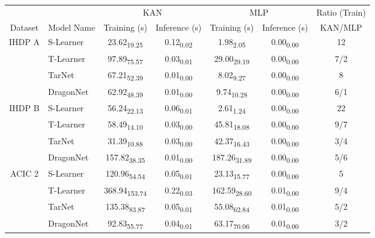 \begin{table}[ht]
\centering
\small
\begin{tabular}{c l cc cc c}

& & \multicolumn{2}{c}{KAN} & \multicolumn{2}{c}{MLP} & Ratio (Train) \\
Dataset & Model Name & Training (s) & Inference (s) & Training (s) & Inference (s) & KAN/MLP \\
 \hline
\multirow{4}{*}{IHDP A}
& S-Learner  & 23.62\textsubscript{19.25} & 0.12\textsubscript{0.02} & 1.98\textsubscript{2.05} & 0.00\textsubscript{0.00} & 12 \\
& T-Learner  & 97.89\textsubscript{75.57} & 0.03\textsubscript{0.01} & 29.00\textsubscript{29.19} & 0.00\textsubscript{0.00} & 7/2 \\
& TarNet     & 67.21\textsubscript{52.39} & 0.01\textsubscript{0.00} & 8.02\textsubscript{9.27} & 0.00\textsubscript{0.00} & 8 \\
& DragonNet  & 62.92\textsubscript{48.39} & 0.01\textsubscript{0.00} & 9.74\textsubscript{10.28} & 0.00\textsubscript{0.00} & 6/1 \\
\hline
\multirow{4}{*}{IHDP B}
& S-Learner  & 56.24\textsubscript{22.13} & 0.06\textsubscript{0.01} & 2.61\textsubscript{1.24} & 0.00\textsubscript{0.00} & 22 \\
& T-Learner  & 58.49\textsubscript{14.10} & 0.03\textsubscript{0.00} & 45.81\textsubscript{18.08} & 0.00\textsubscript{0.00} & 9/7 \\
& TarNet     & 31.39\textsubscript{10.88} & 0.03\textsubscript{0.00} & 42.37\textsubscript{16.43} & 0.00\textsubscript{0.00} & 3/4 \\
& DragonNet  & 157.82\textsubscript{38.35} & 0.01\textsubscript{0.00} & 187.26\textsubscript{31.89} & 0.00\textsubscript{0.00} & 5/6 \\
\hline
\multirow{4}{*}{ACIC 2}
& S-Learner  & 120.96\textsubscript{54.54} & 0.05\textsubscript{0.01} & 23.13\textsubscript{15.77} & 0.00\textsubscript{0.00} & 5 \\
& T-Learner  & 368.94\textsubscript{153.74} & 0.22\textsubscript{0.03} & 162.59\textsubscript{28.60} & 0.01\textsubscript{0.00} & 9/4 \\
& TarNet     & 135.38\textsubscript{83.87} & 0.05\textsubscript{0.01} & 55.08\textsubscript{62.84} & 0.01\textsubscript{0.00} & 5/2 \\
& DragonNet  & 92.83\textsubscript{55.77} & 0.04\textsubscript{0.01} & 63.17\textsubscript{70.06} & 0.01\textsubscript{0.00} & 3/2 \\

\end{tabular}
\end{table}

